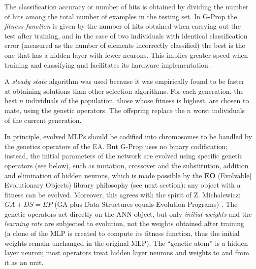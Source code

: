 \documentclass{llncs}
\begin{document}
The classification accuracy or number of hits is obtained by dividing the number of hits among the total number of examples in the testing set.
In G-Prop the \emph{fitness function} is given by the number of hits obtained when carrying out the test after training, and in the case of two individuals with identical classification error (measured as the number of elements incorrectly classified) the best is the one that has a hidden layer with fewer neurons. This implies greater speed when training and classifying and facilitates its hardware implementation. 

A \emph{steady state} \cite{Whitley} algorithm was used because it was empirically found to be faster at obtaining solutions than other selection algorithms. For each generation, the best $n$ individuals of the population, those whose fitness is highest, are chosen to mate, using the genetic operators. The offspring replace the $n$ worst individuals of the current generation.


In principle, evolved MLPs should be codified into chromosomes to be handled by the genetics operators of the EA. But G-Prop uses no binary codification; instead, the initial parameters of the network are evolved using specific genetic operators (see below), such as mutation, crossover and the substitution, addition and elimination of hidden neurons, which is made possible by the \textbf{EO} (Evolvable$|$Evolutionary Objects) library philosophy (see next section): any object with a fitness can be evolved. Moreover, this agrees with the spirit of Z. Michalewicz: $GA + DS = EP$ (GA plus Data Structures equals Evolution Programs) \cite{Michalewicz} . The genetic operators act directly on the ANN object, but only \emph{initial weights} and the \emph{learning rate} are subjected to evolution, not the weights obtained after training (a clone of the MLP is created to compute its fitness function, thus the initial weights remain unchanged in the original MLP). The ``genetic atom'' is a hidden layer neuron; most operators treat hidden layer neurons and weights to and from it as an unit.
\end{document}

